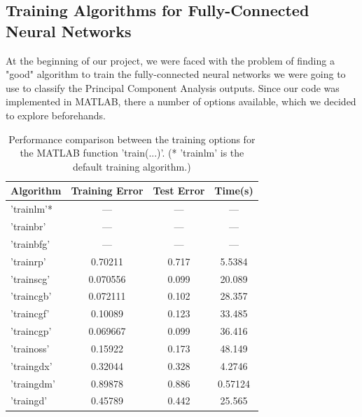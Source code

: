 \documentclass[letterpaper,12pt]{article}
\begin{document}
\subsection*{Training Algorithms for Fully-Connected Neural Networks}

At the beginning of our project, we were faced with the problem of finding a "good" algorithm to train the fully-connected neural networks we were going to use to classify the Principal Component Analysis outputs. Since our code was implemented in MATLAB, there a number of options available, which we decided to explore beforehands. 

\begin{table}[!ht]
\centering
  \begin{tabular}{|l|c|c|c|}
  	\hline
    Algorithm & Training Error & Test Error & Time(s)\\
    \hline
    \hline
    'trainlm'*  & --- & --- & ---\\
    'trainbr'  & --- & --- & ---\\
    'trainbfg'  & --- & --- & ---\\
    'trainrp'  &    0.70211  &   0.717    &      5.5384\\
    'trainscg'  &  0.070556  &   0.099    &      20.089\\
    'traincgb'  &  0.072111  &   0.102     &     28.357\\
    'traincgf'  &   0.10089   &  0.123    &      33.485\\
    'traincgp' &   0.069667  &   0.099    &      36.416\\
    'trainoss'  &   0.15922  &   0.173     &     48.149\\
    'traingdx'  &   0.32044  &   0.328     &     4.2746\\
    'traingdm'  &   0.89878  &   0.886    &     0.57124\\
    'traingd'   &   0.45789  &   0.442    &      25.565\\
    \hline
  \end{tabular}
  \vspace{0.5em}
  \caption{Performance comparison between the training options for the MATLAB function 'train(...)'. \footnotesize{(* 'trainlm' is the default training algorithm.)} }
  \label{table:train_algorithms}
\end{table}
\end{document}
